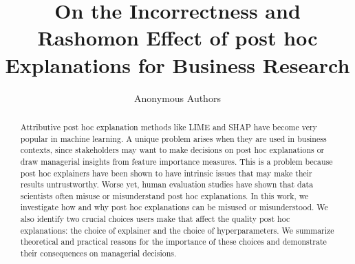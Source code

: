 \documentclass[12pt]{article}    %
\begin{document}
\title{On the Incorrectness and Rashomon Effect of post hoc Explanations for Business Research}

\author{Anonymous Authors}






\maketitle

\begin{abstract}
    Attributive post hoc explanation methods like LIME and SHAP have become very popular in machine learning. A unique problem arises when they are used in business contexts, since stakeholders may want to make decisions on post hoc explanations or draw managerial insights from feature importance measures. This is a problem because post hoc explainers have been shown to have intrinsic issues that may make their results untrustworthy. Worse yet, human evaluation studies have shown that data scientists often misuse or misunderstand post hoc explanations. In this work, we investigate how and why post hoc explanations can be misused or misunderstood. We also identify two crucial choices users make that affect the quality post hoc explanations: the choice of explainer and the choice of hyperparameters. We summarize theoretical and practical reasons for the importance of these choices and demonstrate their consequences on managerial decisions.%
\end{abstract}%
%

\end{document}
